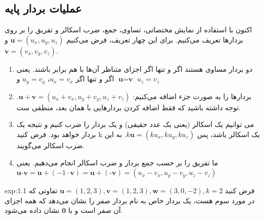 \subsection{\textbf{عملیات بردار پایه}}
\label{subsec:1.1.3}
{
    \Large
    \begin{spacing}{1.5}
        اکنون با استفاده از نمایش مختصاتی، تساوی، جمع، ضرب اسکالر و تفریق را بر روی بردارها تعریف می‌کنیم.
        برای این چهار تعریف، فرض می‌کنیم $\textbf{u}=(u_{x},u_{y},u_{z})$ و  $\textbf{v}=(v_{x},v_{y},v_{z})$.

        \begin{enumerate}[label=\textbf{\arabic*}.]
            \item {دو بردار مساوی هستند اگر و تنها اگر اجزای متناظر آن‌ها با هم برابر باشند.
            یعنی $\textbf{u}=\textbf{v}$ اگر و تنها اگر $u_{x}=v_{x}$، $u_{y}=v_{y}$ و $u_{z}=v_{z}$}
            \item {بردارها را به صورت جزء اضافه می‌کنیم: $\textbf{u}+\textbf{v}=(u_{x}+v_{x},u_{y}+v_{y},u_{z}+v_{z})$.
            توجه داشته باشید که فقط اضافه کردن بردارهایی با همان بعد، منطقی ست.}
            \item {می توانیم یک اسکالر (یعنی یک عدد حقیقی) و یک بردار را ضرب کنیم و نتیجه یک بردار خواهد بود.
            فرض کنید k یک اسکالر باشد، پس $k\textbf{u}=(ku_{x},ku_{y},ku_{z})$. به این ضرب اسکالر می‌گویند.}
            \item {ما تفریق را بر حسب جمع بردار و ضرب اسکالر انجام می‌دهیم.
            یعنی\\$\textbf{u}\textbf{-v}=\textbf{u}+(-1\cdot\textbf{v})=\textbf{u}+(\textbf{-v})=(u_{x}-v_{x},u_{y}-v_{y},u_{z}-v_{z})$}
        \end{enumerate}

        \textbf{\vspace{-10pt}}
        \begin{example}{exp:1.1}
            \Large
            فرض کنید $\textbf{u}=(1,2,3), \textbf{v}=(1,2,3), \textbf{w}=(3,0,-2), k=2$
            تفاوتی که در مورد سوم هست، یک بردار خاص به نام بردار صفر را نشان می‌دهد که همه اجزای آن صفر است و با $\textbf{0}$ نشان داده می‌شود.
        \end{example}


\end{spacing}}
